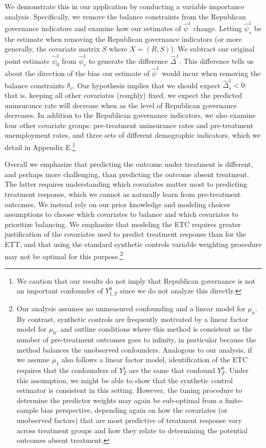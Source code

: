 We demonstrate this in our application by conducting a variable importance analysis. Specifically, we remove the balance constraints from the Republican governance indicators and examine how our estimates of $\hat{\psi}^1$ change. Letting $\hat{\psi}^1_s$ be the estimate when removing the Republican governance indicators (or more generally, the covariate matrix $S$ where $X = (R, S)$). We subtract our original point estimate $\hat{\psi}^1_0$ from $\hat{\psi}^1_s$ to generate the difference $\hat{\Delta}^1$. This difference tells us about the direction of the bias our estimate of $\hat{\psi}^1$ would incur when removing the balance constraints $\delta_v$. Our hypothesis implies that we should expect $\hat{\Delta}_s^1 < 0$: that is, keeping all other covariates (roughly) fixed, we expect the predicted uninsurance rate will decrease when as the level of Republican governance decreases. In addition to the Republican governance indicators, we also examine four other covariate groups: pre-treatment uninsurance rates and pre-treatment unemployment rates, and three sets of different demographic indicators, which we detail in Appendix E.\footnote{We caution that our results do not imply that Republican governance is not an important confounder of $Y^0_{1, T}$ since we do not analyze this directly.} 

Overall we emphasize that predicting the outcome under treatment is different, and perhaps more challenging, than predicting the outcome absent treatment. The latter requires understanding which covariates matter most to predicting treatment response, which we cannot as naturally learn from pre-treatment outcomes. We instead rely on our prior knowledge and modeling choices assumptions to choose which covariates to balance and which covariates to prioritize balancing. We emphasize that modeling the ETC requires greater justification of the covariates used to predict treatment response than for the ETT, and that using the standard synthetic controls variable weighting procedure may not be optimal for this purpose.\footnote{Our analysis assumes no unmeasured confounding and a linear model for $\mu_a$. By contrast, synthetic controls are frequently motivated by a linear factor model for $\mu_0$. \cite{abadie2010synthetic} and \cite{ferman2016revisiting} outline conditions where this method is consistent as the number of pre-treatment outcomes goes to infinity, in particular because the method balances the unobserved confounders. Analogous to our analysis, if we assume $\mu_1$ also follows a linear factor model, identification of the ETC requires that the confounders of $Y^1_T$ are the same that confound $Y^0_T$. Under this assumption, we might be able to show that the synthetic control estimator is consistent in this setting. However, the tuning procedure to determine the predictor weights may again be sub-optimal from a finite-sample bias perspective, depending again on how the covariates (or unobserved factors) that are most predictive of treatment response vary across treatment groups and how they relate to determining the potential outcomes absent treatment.}

